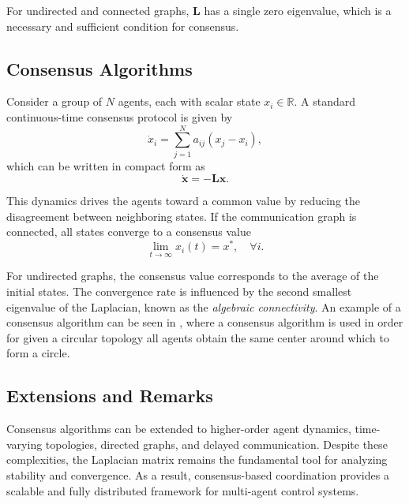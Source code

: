 For undirected and connected graphs, $\mathbf{L}$ has a single zero eigenvalue, which is a necessary and sufficient condition for consensus.

\subsection{Consensus Algorithms}

Consider a group of $N$ agents, each with scalar state $x_i \in \mathbb{R}$.
A standard continuous-time consensus protocol is given by
\begin{equation}
    \dot{x}_i = \sum_{j=1}^{N} a_{ij} (x_j - x_i),
\end{equation}
which can be written in compact form as
\begin{equation}
    \dot{\mathbf{x}} = -\mathbf{L}\mathbf{x}.
\end{equation}

This dynamics drives the agents toward a common value by reducing the disagreement between neighboring states.
If the communication graph is connected, all states converge to a consensus value
\begin{equation}
    \lim_{t \to \infty} x_i(t) = x^\ast, \quad \forall i.
\end{equation}

For undirected graphs, the consensus value corresponds to the average of the initial states.
The convergence rate is influenced by the second smallest eigenvalue of the Laplacian, known as the \textit{algebraic connectivity}. An example of a consensus algorithm can be seen in \cite{Jin2018}, where a consensus algorithm is used in order for given a circular topology all agents obtain the same center around which to form a circle.

\subsection{Extensions and Remarks}

Consensus algorithms can be extended to higher-order agent dynamics, time-varying topologies, directed graphs, and delayed communication.
Despite these complexities, the Laplacian matrix remains the fundamental tool for analyzing stability and convergence.
As a result, consensus-based coordination provides a scalable and fully distributed framework for multi-agent control systems.
